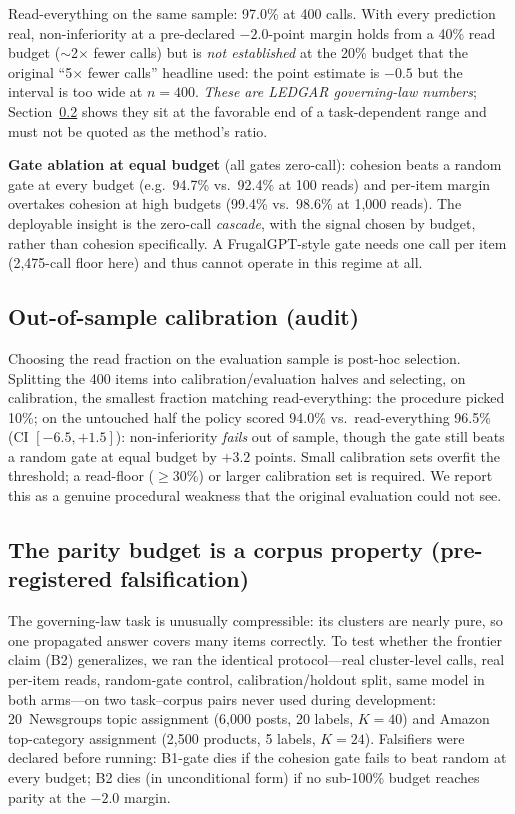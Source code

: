 \documentclass[11pt]{article}
\begin{document}
Read-everything on the same sample: 97.0\% at 400 calls. With every prediction real, non-inferiority at a pre-declared $-2.0$-point margin holds from a 40\% read budget ($\sim$2$\times$ fewer calls) but is \emph{not established} at the 20\% budget that the original ``5$\times$ fewer calls'' headline used: the point estimate is $-0.5$ but the interval is too wide at $n{=}400$. \emph{These are LEDGAR governing-law numbers}; Section~\ref{sec:generality} shows they sit at the favorable end of a task-dependent range and must not be quoted as the method's ratio.

\textbf{Gate ablation at equal budget} (all gates zero-call): cohesion beats a random gate at every budget (e.g.\ 94.7\% vs.\ 92.4\% at 100 reads) and per-item margin overtakes cohesion at high budgets (99.4\% vs.\ 98.6\% at 1{,}000 reads). The deployable insight is the zero-call \emph{cascade}, with the signal chosen by budget, rather than cohesion specifically. A FrugalGPT-style gate needs one call per item (2{,}475-call floor here) and thus cannot operate in this regime at all.

\subsection{Out-of-sample calibration (audit)}\label{sec:oos}
Choosing the read fraction on the evaluation sample is post-hoc selection. Splitting the 400 items into calibration/evaluation halves and selecting, on calibration, the smallest fraction matching read-everything: the procedure picked 10\%; on the untouched half the policy scored 94.0\% vs.\ read-everything 96.5\% (CI $[-6.5, +1.5]$): non-inferiority \emph{fails} out of sample, though the gate still beats a random gate at equal budget by $+3.2$ points. Small calibration sets overfit the threshold; a read-floor ($\geq$30\%) or larger calibration set is required. We report this as a genuine procedural weakness that the original evaluation could not see.

\subsection{The parity budget is a corpus property (pre-registered falsification)}\label{sec:generality}
The governing-law task is unusually compressible: its clusters are nearly pure, so one propagated answer covers many items correctly. To test whether the frontier claim (B2) generalizes, we ran the identical protocol---real cluster-level calls, real per-item reads, random-gate control, calibration/holdout split, same model in both arms---on two task--corpus pairs never used during development: 20~Newsgroups topic assignment (6{,}000 posts, 20 labels, $K{=}40$) and Amazon top-category assignment (2{,}500 products, 5 labels, $K{=}24$). Falsifiers were declared before running: B1-gate dies if the cohesion gate fails to beat random at every budget; B2 dies (in unconditional form) if no sub-100\% budget reaches parity at the $-2.0$ margin.
\end{document}
